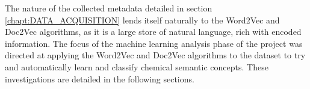 The nature of the collected metadata detailed in section \ref{chapt:DATA_ACQUISITION} lends itself naturally to the Word2Vec and Doc2Vec algorithms, as it is a large store of natural language, rich with encoded information. The focus of the machine learning analysis phase of the project was directed at applying the Word2Vec and Doc2Vec algorithms to the dataset to try and automatically learn and classify chemical semantic concepts. These investigations are detailed in the following sections.